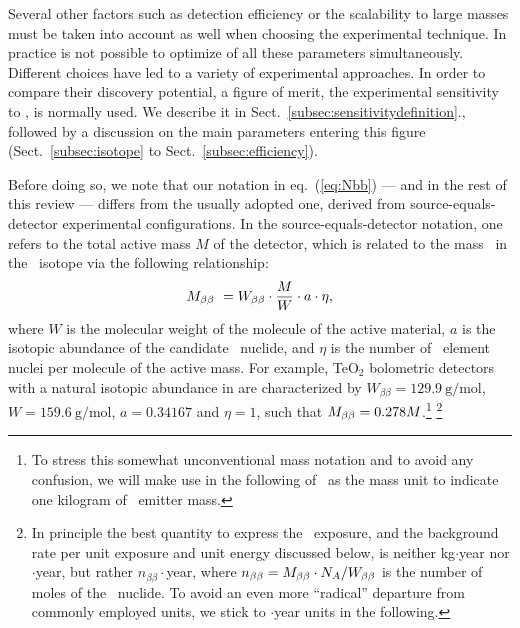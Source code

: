
Several other factors such as detection efficiency or the scalability to large masses must be taken into account as well when choosing the experimental technique. In practice is not possible to optimize of all these parameters simultaneously. Different choices have led to a variety of experimental approaches. In order to compare their discovery potential, a figure of merit, the experimental sensitivity to \mbb, is normally used. We describe it in Sect.~\ref{subsec:sensitivitydefinition}., followed by a discussion on the main parameters entering this figure (Sect.~\ref{subsec:isotope} to Sect.~\ref{subsec:efficiency}).

Before doing so, we note that our notation in eq.~(\ref{eq:Nbb}) --- and in the rest of this review --- differs from the usually adopted one, derived from source-equals-detector experimental configurations. In the source-equals-detector notation, one refers to the total active mass $M$ of the detector, which is related to the mass \Mbb\ in the \bb\ isotope via the following relationship:
%
\begin{equation}
M_{\beta\beta}\ = W_{\beta\beta}\cdot \frac{M}{W}\cdot a\cdot \eta ,
\label{eq:mbbversusm}
\end{equation}
%
where $W$ is the molecular weight of the molecule of the active material, $a$ is the isotopic abundance of the candidate \bbonu\ nuclide, and $\eta$ is the number of \bbonu\ element nuclei per molecule of the active mass. For example, TeO$_2$ bolometric detectors with a natural isotopic abundance in  are characterized by $W_{\beta\beta}=129.9\ \mathrm{g/mol}$, $W=159.6\ \mathrm{g/mol}$, $a=0.34167$ and $\eta=1$, such that $M_{\beta\beta} = 0.278 M$.\footnote{To stress this somewhat unconventional mass notation and to avoid any confusion, we will make use in the following of \kgbb\ as the mass unit to indicate one kilogram of \bb\ emitter mass.} \footnote{In principle the best quantity to express the \bbonu\ exposure, and the background rate per unit exposure and unit energy discussed below, is neither kg$\cdot$year nor \kgbb $\cdot$year, but rather $n_{\beta\beta}\cdot$year, where $n_{\beta\beta}=M_{\beta\beta} \cdot N_A/W_{\beta\beta}$ is the number of moles of the \bb\ nuclide. To avoid an even more ``radical'' departure from commonly employed units, we stick to \kgbb$\cdot$year units in the following.}


